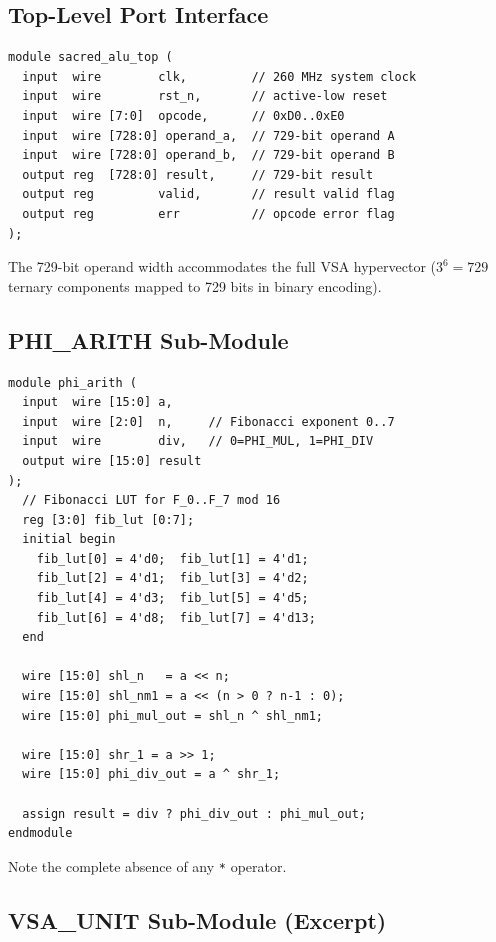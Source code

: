 \subsection{Top-Level Port Interface}
\label{subsec:72:port-interface}

\begin{verbatim}
module sacred_alu_top (
  input  wire        clk,         // 260 MHz system clock
  input  wire        rst_n,       // active-low reset
  input  wire [7:0]  opcode,      // 0xD0..0xE0
  input  wire [728:0] operand_a,  // 729-bit operand A
  input  wire [728:0] operand_b,  // 729-bit operand B
  output reg  [728:0] result,     // 729-bit result
  output reg         valid,       // result valid flag
  output reg         err          // opcode error flag
);
\end{verbatim}

The 729-bit operand width accommodates the full VSA hypervector
($3^6 = 729$ ternary components mapped to 729 bits in binary encoding).

\subsection{PHI\_ARITH Sub-Module}
\label{subsec:72:phi-arith}

\begin{verbatim}
module phi_arith (
  input  wire [15:0] a,
  input  wire [2:0]  n,     // Fibonacci exponent 0..7
  input  wire        div,   // 0=PHI_MUL, 1=PHI_DIV
  output wire [15:0] result
);
  // Fibonacci LUT for F_0..F_7 mod 16
  reg [3:0] fib_lut [0:7];
  initial begin
    fib_lut[0] = 4'd0;  fib_lut[1] = 4'd1;
    fib_lut[2] = 4'd1;  fib_lut[3] = 4'd2;
    fib_lut[4] = 4'd3;  fib_lut[5] = 4'd5;
    fib_lut[6] = 4'd8;  fib_lut[7] = 4'd13;
  end

  wire [15:0] shl_n   = a << n;
  wire [15:0] shl_nm1 = a << (n > 0 ? n-1 : 0);
  wire [15:0] phi_mul_out = shl_n ^ shl_nm1;

  wire [15:0] shr_1 = a >> 1;
  wire [15:0] phi_div_out = a ^ shr_1;

  assign result = div ? phi_div_out : phi_mul_out;
endmodule
\end{verbatim}

Note the complete absence of any \texttt{*} operator.

\subsection{VSA\_UNIT Sub-Module (Excerpt)}
\label{subsec:72:vsa-unit}

